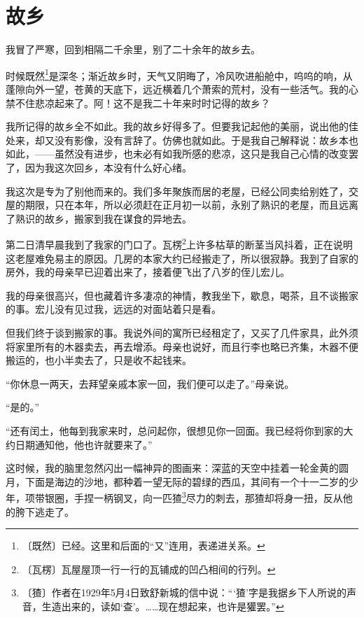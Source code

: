 \documentclass[12pt,UTF-8,openany]{ctexbook}
\begin{document}
\chapter{故乡}

\begin{normalsize}
    
    我冒了严寒，回到相隔二千余里，别了二十余年的故乡去。
    
    时候既然\footnote{〔既然〕已经。这里和后面的“又”连用，表递进关系。}是深冬；渐近故乡时，天气又阴晦了，冷风吹进船舱中，呜呜的响，从蓬隙向外一望，苍黄的天底下，远近横着几个萧索的荒村，没有一些活气。我的心禁不住悲凉起来了。阿！这不是我二十年来时时记得的故乡？
    
    我所记得的故乡全不如此。我的故乡好得多了。但要我记起他的美丽，说出他的佳处来，却又没有影像，没有言辞了。仿佛也就如此。于是我自己解释说：故乡本也如此，——虽然没有进步，也未必有如我所感的悲凉，这只是我自己心情的改变罢了，因为我这次回乡，本没有什么好心绪。
    
    我这次是专为了别他而来的。我们多年聚族而居的老屋，已经公同卖给别姓了，交屋的期限，只在本年，所以必须赶在正月初一以前，永别了熟识的老屋，而且远离了熟识的故乡，搬家到我在谋食的异地去。
    
    第二日清早晨我到了我家的门口了。瓦楞\footnote{〔瓦楞〕瓦屋屋顶一行一行的瓦铺成的凹凸相间的行列。}上许多枯草的断茎当风抖着，正在说明这老屋难免易主的原因。几房的本家大约已经搬走了，所以很寂静。我到了自家的房外，我的母亲早已迎着出来了，接着便飞出了八岁的侄儿宏儿。
    
    我的母亲很高兴，但也藏着许多凄凉的神情，教我坐下，歇息，喝茶，且不谈搬家的事。宏儿没有见过我，远远的对面站着只是看。
    
    但我们终于谈到搬家的事。我说外间的寓所已经租定了，又买了几件家具，此外须将家里所有的木器卖去，再去增添。母亲也说好，而且行李也略已齐集，木器不便搬运的，也小半卖去了，只是收不起钱来。
    
    “你休息一两天，去拜望亲戚本家一回，我们便可以走了。”母亲说。
    
    “是的。”
    
    “还有闰土，他每到我家来时，总问起你，很想见你一回面。我已经将你到家的大约日期通知他，他也许就要来了。”
    
    这时候，我的脑里忽然闪出一幅神异的图画来：深蓝的天空中挂着一轮金黄的圆月，下面是海边的沙地，都种着一望无际的碧绿的西瓜，其间有一个十一二岁的少年，项带银圈，手捏一柄钢叉，向一匹猹\footnote{〔猹〕作者在1929年5月4日致舒新城的信中说：“‘猹’字是我据乡下人所说的声音，生造出来的，读如‘查’。……现在想起来，也许是獾罢。”}尽力的刺去，那猹却将身一扭，反从他的胯下逃走了。
    

\end{normalsize}
\end{document}
